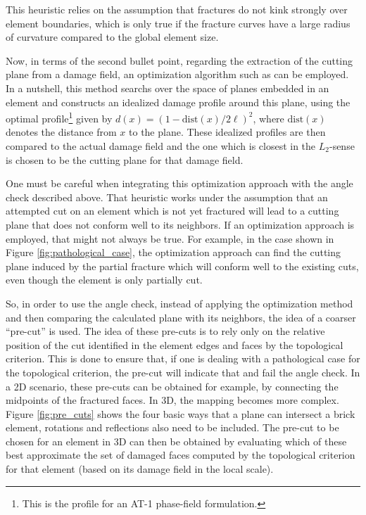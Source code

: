 This heuristic relies on the assumption that fractures do not kink strongly over element boundaries, which is only true if the fracture curves have a large radius of curvature compared to the global element size. 

Now, in terms of the second bullet point, regarding the extraction of the cutting plane from a damage field, an optimization algorithm such as \cite{geelen2018optimization} can be employed. In a nutshell, this method searchs over the space of planes embedded in an element and constructs an idealized damage profile around this plane, using the optimal profile\footnote{This is the profile for an AT-1 phase-field formulation.} given by $d(x) = (1-\text{dist}(x)/2\ell)^2$, where $\text{dist}(x)$ denotes the distance from $x$ to the plane. These idealized profiles are then compared to the actual damage field and the one which is closest in the $L_2$-sense is chosen to be the cutting plane for that damage field.

One must be careful when integrating this optimization approach with the angle check described above. That heuristic works under the assumption that an attempted cut on an element which is not yet fractured will lead to a cutting plane that does not conform well to its neighbors. If an optimization approach is employed, that might not always be true. For example, in the case shown in Figure \ref{fig:pathological_case}, the optimization approach can find the cutting plane induced by the partial fracture which will conform well to the existing cuts, even though the element is only partially cut.

So, in order to use the angle check, instead of applying the optimization method and then comparing the calculated plane with its neighbors, the idea of a coarser ``pre-cut'' is used. The idea of these pre-cuts is to rely only on the relative position of the cut identified in the element edges and faces by the topological criterion. This is done to ensure that, if one is dealing with a pathological case for the topological criterion, the pre-cut will indicate that and fail the angle check. In a 2D scenario, these pre-cuts can be obtained for example, by connecting the midpoints of the fractured faces. In 3D, the mapping becomes more complex. Figure \ref{fig:pre_cuts} shows the four basic ways that a plane can intersect a brick element, rotations and reflections also need to be included. The pre-cut to be chosen for an element in 3D can then be obtained by evaluating which of these best approximate the set of damaged faces computed by the topological criterion for that element (based on its damage field in the local scale). 

